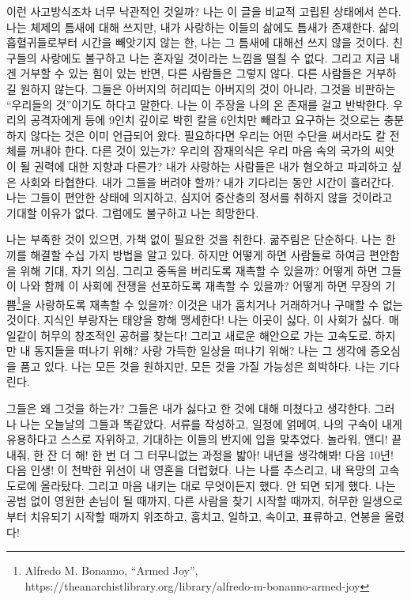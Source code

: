 \documentclass[11pt, b6paper, openany]{memoir}
\begin{document}
\begin{article}
이런 사고방식조차 너무 낙관적인 것일까? 나는 이 글을 비교적 고립된 상태에서 쓴다. 나는 체제의 틈새에 대해 쓰지만, 내가 사랑하는 이들의 삶에도 틈새가 존재한다. 삶의 흡혈귀들로부터 시간을 빼앗기지 않는 한, 나는 그 틈새에 대해선 쓰지 않을 것이다. 친구들의 사랑에도 불구하고 나는 혼자일 것이라는 느낌을 떨칠 수 없다. 그리고 지금 내겐 거부할 수 있는 힘이 있는 반면, 다른 사람들은 그렇지 않다. 다른 사람들은 거부하길 원하지 않는다. 그들은 아버지의 허리띠는 아버지의 것이 아니라, 그것을 비판하는 “우리들의 것”이기도 하다고 말한다. 나는 이 주장을 나의 온 존재를 걸고 반박한다. 우리의 공격자에게 등에 9인치 깊이로 박힌 칼을 6인치만 빼라고 요구하는 것으로는 충분하지 않다는 것은 이미 언급되어 왔다. 필요하다면 우리는 어떤 수단을 써서라도 칼 전체를 꺼내야 한다. 다른 것이 있는가? 우리의 잠재의식은 우리 마음 속의 국가의 씨앗이 될 권력에 대한 지향과 다른가? 내가 사랑하는 사람들은 내가 혐오하고 파괴하고 싶은 사회와 타협한다. 내가 그들을 버려야 할까? 내가 기다리는 동안 시간이 흘러간다. 나는 그들이 편안한 상태에 의지하고, 심지어 중산층의 정서를 취하지 않을 것이라고 기대할 이유가 없다. 그럼에도 불구하고 나는 희망한다. 

나는 부족한 것이 있으면, 가책 없이 필요한 것을 취한다. 굶주림은 단순하다. 나는 한 끼를 해결할 수십 가지 방법을 알고 있다. 하지만 어떻게 하면 사람들로 하여금 편안함을 위해 기대, 자기 의심, 그리고 중독을 버리도록 재촉할 수 있을까? 어떻게 하면 그들이 나와 함께 이 사회에 전쟁을 선포하도록 재촉할 수 있을까? 어떻게 하면 무장의 기쁨\footnote{Alfredo M. Bonanno, “Armed Joy”, https://theanarchistlibrary.org/library/alfredo-m-bonanno-armed-joy}을 사랑하도록 재촉할 수 있을까? 이것은 내가 훔치거나 거래하거나 구매할 수 없는 것이다. 지식인 부랑자는 태양을 향해 맹세한다! 나는 이곳이 싫다, 이 사회가 싫다. 매일같이 허무의 창조적인 공허를 찾는다! 그리고 새로운 해안으로 가는 고속도로. 하지만 내 동지들을 떠나기 위해? 사랑 가득한 일상을 떠나기 위해? 나는 그 생각에 증오심을 품고 있다. 나는 모든 것을 원하지만, 모든 것을 가질 가능성은 희박하다. 나는 기다린다.

그들은 왜 그것을 하는가? 그들은 내가 싫다고 한 것에 대해 미쳤다고 생각한다. 그러나 나는 오늘날의 그들과 똑같았다. 서류를 작성하고, 일정에 얽메여, 나의 구속이 내게 유용하다고 스스로 자위하고, 기대하는 이들의 반지에 입을 맞추었다. 놀라워, 앤디! 끝내줘, 한 잔 더 해! 한 번 더 그 터무니없는 과정을 밟아! 내년을 생각해봐! 다음 10년! 다음 인생! 이 천박한 위선이 내 영혼을 더럽혔다. 나는 나를 추스리고, 내 욕망의 고속도로에 올라탔다. 그리고 마음 내키는 대로 무엇이든지 했다. 안 되면 되게 했다. 나는 공범 없이 영원한 손님이 될 때까지, 다른 사람을 찾기 시작할 때까지, 허무한 일생으로부터 치유되기 시작할 때까지 위조하고, 훔치고, 일하고, 속이고, 표류하고, 연봉을 올렸다! 


\end{article}
\end{document}

